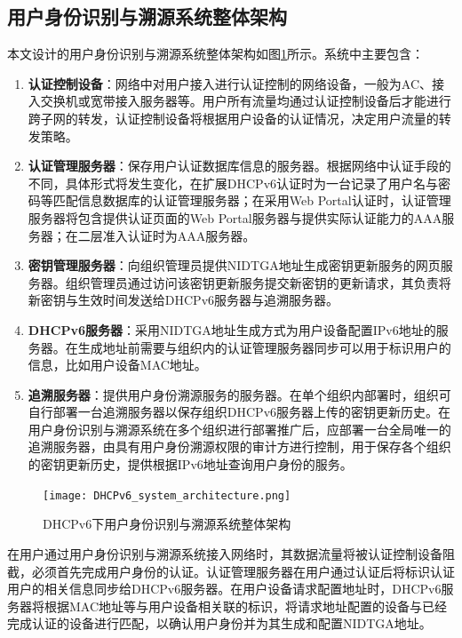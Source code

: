     \subsection{用户身份识别与溯源系统整体架构}
    \label{NIDTGA:DHCPv6:architecture}
    本文设计的用户身份识别与溯源系统整体架构如图\ref{fig:DHCPv6_system_architecture}所示。系统中主要包含：
    \begin{enumerate}[1{)}]
      \item \textbf{认证控制设备}：网络中对用户接入进行认证控制的网络设备，一般为AC、接入交换机或宽带接入服务器等。用户所有流量均通过认证控制设备后才能进行跨子网的转发，认证控制设备将根据用户设备的认证情况，决定用户流量的转发策略。
      \item \textbf{认证管理服务器}：保存用户认证数据库信息的服务器。根据网络中认证手段的不同，具体形式将发生变化，在扩展DHCPv6认证时为一台记录了用户名与密码等匹配信息数据库的认证管理服务器；在采用Web Portal认证时，认证管理服务器将包含提供认证页面的Web Portal服务器与提供实际认证能力的AAA服务器；在二层准入认证时为AAA服务器。
      \item \textbf{密钥管理服务器}：向组织管理员提供NIDTGA地址生成密钥更新服务的网页服务器。组织管理员通过访问该密钥更新服务提交新密钥的更新请求，其负责将新密钥与生效时间发送给DHCPv6服务器与追溯服务器。
      \item \textbf{DHCPv6服务器}：采用NIDTGA地址生成方式为用户设备配置IPv6地址的服务器。在生成地址前需要与组织内的认证管理服务器同步可以用于标识用户的信息，比如用户设备MAC地址。
      \item \textbf{追溯服务器}：提供用户身份溯源服务的服务器。在单个组织内部署时，组织可自行部署一台追溯服务器以保存组织DHCPv6服务器上传的密钥更新历史。在用户身份识别与溯源系统在多个组织进行部署推广后，应部署一台全局唯一的追溯服务器，由具有用户身份溯源权限的审计方进行控制，用于保存各个组织的密钥更新历史，提供根据IPv6地址查询用户身份的服务。
    \end{enumerate}

    \begin{figure}[ht]
      \centering
      \texttt{[image: DHCPv6\_system\_architecture.png]}
      \caption{DHCPv6下用户身份识别与溯源系统整体架构}
      \label{fig:DHCPv6_system_architecture}
    \end{figure}

    在用户通过用户身份识别与溯源系统接入网络时，其数据流量将被认证控制设备阻截，必须首先完成用户身份的认证。认证管理服务器在用户通过认证后将标识认证用户的相关信息同步给DHCPv6服务器。在用户设备请求配置地址时，DHCPv6服务器将根据MAC地址等与用户设备相关联的标识，将请求地址配置的设备与已经完成认证的设备进行匹配，以确认用户身份并为其生成和配置NIDTGA地址。

